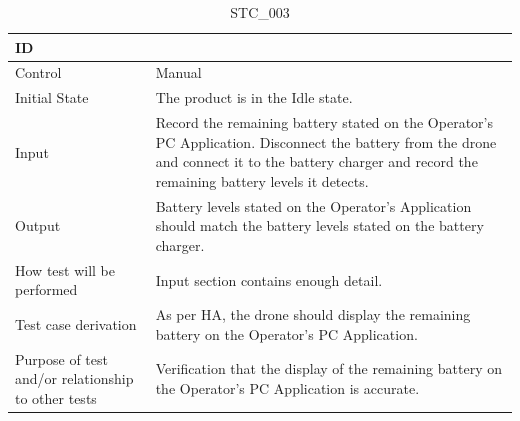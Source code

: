 \documentclass[12pt, titlepage]{article}
\begin{document}
\begin{enumerate}
\begin{table}[!h]
\begin{center}
\caption {STC\_003}
\label{tab:STC_003}
\begin{tabular}{ | m{3.2cm} | m{12.2cm} | } 
\hline
ID & \nameref{tab:STC_003} \\ 
\hline
Control & Manual \\ 
\hline
Initial State & The product is in the Idle state. \\ 
\hline
Input & Record the remaining battery stated on the Operator's PC Application. Disconnect the battery from the drone and connect it to the battery charger and record the remaining battery levels it detects. \\ 
\hline
Output & Battery levels stated on the Operator's Application should match the battery levels stated on the battery charger. \\ 
\hline
How test will be performed & Input section contains enough detail. \\ 
\hline
Test case derivation & As per HA, the drone should display the remaining battery on the Operator's PC Application. \\ 
\hline
Purpose of test and/or relationship to other tests & Verification that the display of the remaining battery on the Operator's PC Application is accurate. \\ 
\hline
\end{tabular}
\end{center}
\end{table}


\end{enumerate}
\end{document}
